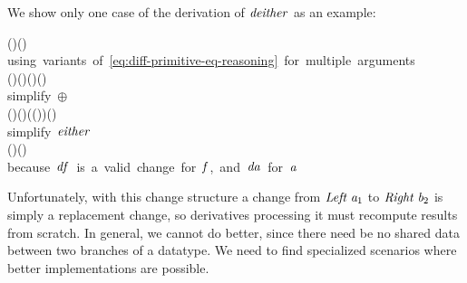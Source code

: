 We show only one case of the derivation of \ensuremath{\Varid{deither}} as an example:
\begin{equational}
\begin{hscode}\SaveRestoreHook
{}%
%
%
\>[7]{}\;\;\;\;\;(\;)\;(\;){}\<[E]%
\\
\>[B]{}\Doe\mbox{\commentbegin  using variants of \cref{eq:diff-primitive-eq-reasoning} for multiple arguments  \commentend}{}\<[E]%
\\
\>[B]{}\<[7]%
\>[7]{}\;(\oplus {})\;(\oplus {})\;(\;\oplus {}\;)\ominus {}\;\;\;(\;){}\<[E]%
\\
\>[B]{}\mathrel{=}{}\<[7]%
\>[7]{}\mbox{\commentbegin  simplify \ensuremath{\oplus }  \commentend}{}\<[E]%
\\
\>[7]{}\;(\oplus {})\;(\oplus {})\;(\;(\oplus {}))\ominus {}\;\;\;(\;){}\<[E]%
\\
\>[B]{}\mathrel{=}{}\<[7]%
\>[7]{}\mbox{\commentbegin  simplify \ensuremath{\Varid{either}}  \commentend}{}\<[E]%
\\
\>[7]{}(\oplus {})\;(\oplus {})\ominus {}\;\<[E]%
\\
\>[B]{}\Doe\mbox{\commentbegin  because \ensuremath{\Varid{df}} is a valid change for \ensuremath{\Varid{f}}, and \ensuremath{\Varid{da}} for \ensuremath{\Varid{a}}  \commentend}{}\<[E]%
\\
\>[B]{}\<[7]%
\>[7]{}\;\;\<[E]%
\ColumnHook
\end{hscode}\resethooks
\end{equational}

Unfortunately, with this change structure a change from \ensuremath{\Conid{Left}\;\Varid{a}_{1}} to \ensuremath{\Conid{Right}\;\Varid{b}_{2}}
is simply a replacement change, so derivatives processing it must recompute
results from scratch.
In general, we cannot do better, since there need be no shared data between two
branches of a datatype. We need to find specialized scenarios where better
implementations are possible.

